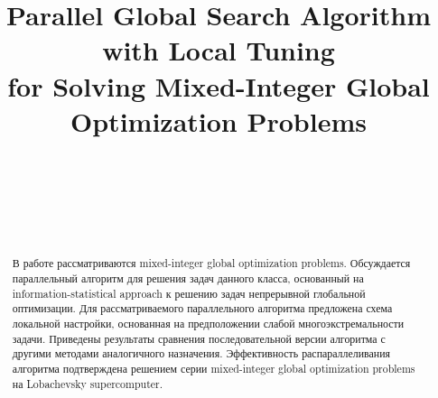 \documentclass[
11pt,%
tightenlines,%
twoside,%
onecolumn,%
nofloats,%
nobibnotes,%
nofootinbib,%
superscriptaddress,%
noshowpacs,%
centertags]%
{revtex4}
\begin{document}

\title{Parallel Global Search Algorithm with Local Tuning\\ 
for Solving Mixed-Integer Global Optimization Problems}

\author{~}

\author{~}

\author{~}




\begin{abstract} %
В работе рассматриваются mixed-integer global optimization problems. Обсуждается параллельный алгоритм для решения задач данного класса, основанный на information-statistical approach к решению задач непрерывной глобальной оптимизации. Для рассматриваемого параллельного алгоритма предложена схема локальной настройки, основанная на предположении слабой многоэкстремальности задачи. 
Приведены результаты сравнения последовательной версии алгоритма с другими методами аналогичного назначения. 
Эффективность распараллеливания алгоритма подтверждена решением серии mixed-integer global optimization problems на Lobachevsky supercomputer. 
\end{abstract}

\end{document}
